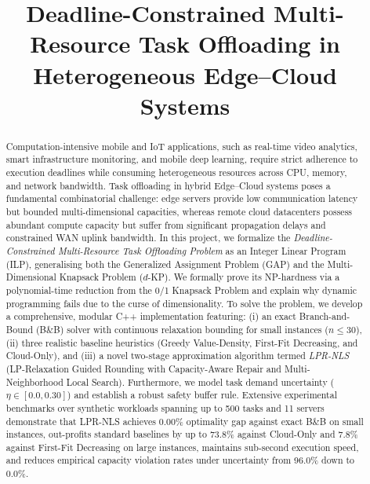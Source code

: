 \documentclass[conference,10pt]{IEEEtran}
\begin{document}
\title{Deadline-Constrained Multi-Resource Task Offloading in Heterogeneous Edge--Cloud Systems}

\author{
}

\maketitle

\begin{abstract}
Computation-intensive mobile and IoT applications, such as real-time video analytics, smart infrastructure monitoring, and mobile deep learning, require strict adherence to execution deadlines while consuming heterogeneous resources across CPU, memory, and network bandwidth. Task offloading in hybrid Edge--Cloud systems poses a fundamental combinatorial challenge: edge servers provide low communication latency but bounded multi-dimensional capacities, whereas remote cloud datacenters possess abundant compute capacity but suffer from significant propagation delays and constrained WAN uplink bandwidth. 
In this project, we formalize the \textit{Deadline-Constrained Multi-Resource Task Offloading Problem} as an Integer Linear Program (ILP), generalising both the Generalized Assignment Problem (GAP) and the Multi-Dimensional Knapsack Problem ($d$-KP). We formally prove its NP-hardness via a polynomial-time reduction from the 0/1 Knapsack Problem and explain why dynamic programming fails due to the curse of dimensionality. 
To solve the problem, we develop a comprehensive, modular C++ implementation featuring: (i) an exact Branch-and-Bound (B\&B) solver with continuous relaxation bounding for small instances ($n \le 30$), (ii) three realistic baseline heuristics (Greedy Value-Density, First-Fit Decreasing, and Cloud-Only), and (iii) a novel two-stage approximation algorithm termed \textit{LPR-NLS} (LP-Relaxation Guided Rounding with Capacity-Aware Repair and Multi-Neighborhood Local Search). Furthermore, we model task demand uncertainty ($\eta \in [0.0, 0.30]$) and establish a robust safety buffer rule.
Extensive experimental benchmarks over synthetic workloads spanning up to 500 tasks and 11 servers demonstrate that LPR-NLS achieves 0.00\% optimality gap against exact B\&B on small instances, out-profits standard baselines by up to 73.8\% against Cloud-Only and 7.8\% against First-Fit Decreasing on large instances, maintains sub-second execution speed, and reduces empirical capacity violation rates under uncertainty from 96.0\% down to 0.0\%.
\end{abstract}
\end{document}
